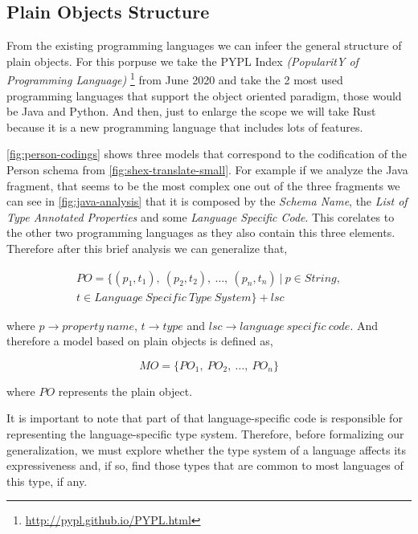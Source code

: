 \subsection{Plain Objects Structure}
From the existing programming languages we can infeer the general structure of plain objects. For this porpuse
we take the PYPL Index \textit{(PopularitY of Programming Language)} \footnote{\url{http://pypl.github.io/PYPL.html}}
from June 2020 and take the 2 most used programming languages that support the object oriented paradigm,
those would be Java and Python. And then, just to enlarge the scope we will take Rust because it is a new programming
language that includes lots of features.

\cref{fig:person-codings} shows three models that correspond to the codification of the Person schema from
\cref{fig:shex-translate-small}. For example if we analyze the Java fragment, that seems to be the most complex
one out of the three fragments we can see in \cref{fig:java-analysis} that it is composed by the \textit{Schema Name},
the \textit{List of Type Annotated Properties} and some \textit{Language Specific Code}. This corelates to the other
two programming languages as they also contain this three elements. Therefore after this brief analysis we can generalize that,

\begin{equation}\label{eq:plain-object}
\begin{gathered}
PO = \{ (p_{1}, t_{1}),\ (p_{2}, t_{2}),\ \dots,\ (p_{n}, t_{n})\ |\ p \in String,\\
t\in Language\ Specific\ Type\ System \} + lsc
\end{gathered}
\end{equation}

where $p \rightarrow property\ name$, $t \rightarrow type$ and $lsc \rightarrow language\ specific\ code$.
And therefore a model based on plain objects is defined as,

\begin{equation}\label{eq:plain-object-model}
MO = \{ PO_1,\ PO_2,\ \dots,\ PO_n \}
\end{equation}

where $PO$ represents the plain object.

It is important to note that part of that language-specific code is responsible for representing the language-specific type system.
Therefore, before formalizing our generalization, we must explore whether the type system of a language affects its expressiveness
and, if so, find those types that are common to most languages of this type, if any.

